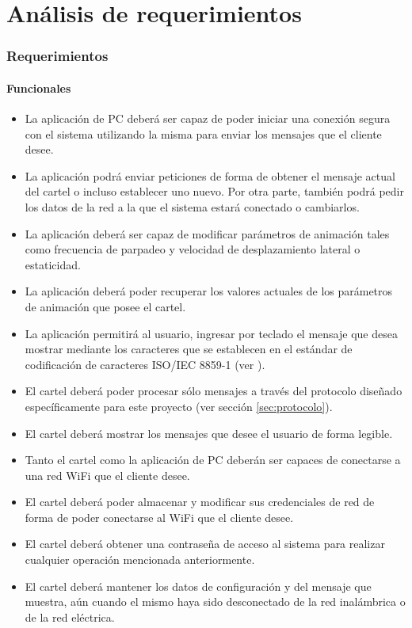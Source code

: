 \part{Análisis de requerimientos}\label{part:analisis}
\section{Requerimientos}
\subsection{Funcionales}
\begin{itemize}
	\item La aplicación de PC deberá ser capaz de poder iniciar una conexión segura con el sistema utilizando la misma para enviar los mensajes que el cliente desee.
	\item La aplicación podrá enviar peticiones de forma de obtener el mensaje actual del cartel o incluso establecer uno nuevo. Por otra parte, también podrá pedir los datos de la red a la que el sistema estará conectado o cambiarlos.
	\item La aplicación deberá ser capaz de modificar parámetros de animación tales como frecuencia de parpadeo y velocidad de desplazamiento lateral o estaticidad.
	\item La aplicación deberá poder recuperar los valores actuales de los parámetros de animación que posee el cartel.
	\item La aplicación permitirá al usuario, ingresar por teclado el mensaje que desea mostrar mediante los caracteres que se establecen en el estándar de codificación de caracteres ISO/IEC 8859-1 (ver \cite{CodifChar}).
	\item El cartel deberá poder procesar sólo mensajes a través del protocolo diseñado específicamente para este proyecto (ver sección \ref{sec:protocolo}).
	\item El cartel deberá mostrar los mensajes que desee el usuario de forma legible.
	\item Tanto el cartel como la aplicación de PC deberán ser capaces de conectarse a una red WiFi que el cliente desee.
	\item El cartel deberá poder almacenar y modificar sus credenciales de red de forma de poder conectarse al WiFi que el cliente desee.
	\item El cartel deberá obtener una contraseña de acceso al sistema para realizar cualquier operación mencionada anteriormente.
	\item El cartel deberá mantener los datos de configuración y del mensaje que muestra, aún cuando el mismo haya sido desconectado de la red inalámbrica o de la red eléctrica.

\end{itemize}
